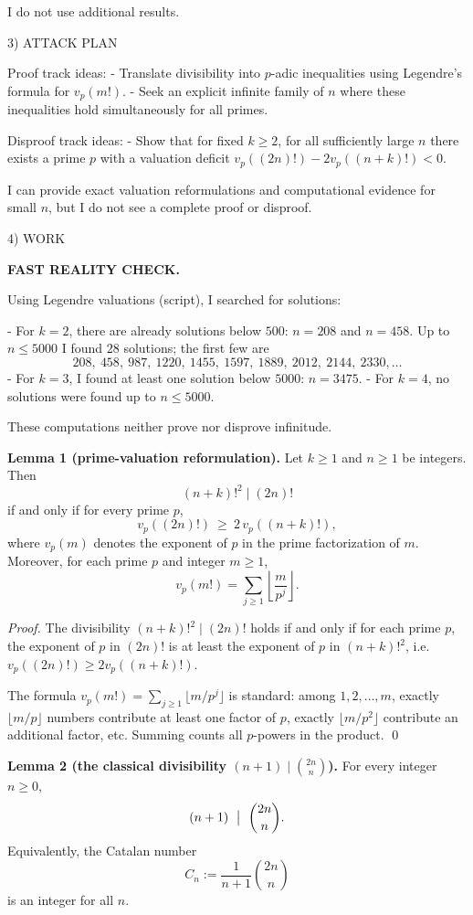 I do not use additional results.

3) ATTACK PLAN

Proof track ideas:
- Translate divisibility into $p$-adic inequalities using Legendre's formula for $v_p(m!)$.
- Seek an explicit infinite family of $n$ where these inequalities hold simultaneously for all primes.

Disproof track ideas:
- Show that for fixed $k\ge 2$, for all sufficiently large $n$ there exists a prime $p$ with a valuation deficit $v_p((2n)!)-2v_p((n+k)!)<0$.

I can provide exact valuation reformulations and computational evidence for small $n$, but I do not see a complete proof or disproof.

4) WORK

\textbf{FAST REALITY CHECK.}

Using Legendre valuations (script), I searched for solutions:

- For $k=2$, there are already solutions below $500$: $n=208$ and $n=458$.
  Up to $n\le 5000$ I found $28$ solutions; the first few are
  \[
  208,\ 458,\ 987,\ 1220,\ 1455,\ 1597,\ 1889,\ 2012,\ 2144,\ 2330,\dots
  \]
- For $k=3$, I found at least one solution below $5000$: $n=3475$.
- For $k=4$, no solutions were found up to $n\le 5000$.

These computations neither prove nor disprove infinitude.

\medskip

\textbf{Lemma 1 (prime-valuation reformulation).}
Let $k\ge 1$ and $n\ge 1$ be integers. Then
\[
(n+k)!^2 \mid (2n)!
\]
if and only if for every prime $p$,
\[
 v_p((2n)!) \ \ge\ 2\,v_p((n+k)!),
\]
where $v_p(m)$ denotes the exponent of $p$ in the prime factorization of $m$.
Moreover, for each prime $p$ and integer $m\ge 1$,
\[
 v_p(m!) = \sum_{j\ge 1} \left\lfloor \frac{m}{p^j}\right\rfloor.
\]

\emph{Proof.}
The divisibility $(n+k)!^2\mid (2n)!$ holds if and only if for each prime $p$, the exponent of $p$ in $(2n)!$ is at least the exponent of $p$ in $(n+k)!^2$, i.e.
$v_p((2n)!)\ge 2v_p((n+k)!)$.

The formula $v_p(m!)=\sum_{j\ge 1}\lfloor m/p^j\rfloor$ is standard: among $1,2,\dots,m$, exactly $\lfloor m/p\rfloor$ numbers contribute at least one factor of $p$, exactly $\lfloor m/p^2\rfloor$ contribute an additional factor, etc. Summing counts all $p$-powers in the product.
\qed

\medskip

\textbf{Lemma 2 (the classical divisibility $(n+1)\mid \binom{2n}{n}$).}
For every integer $n\ge 0$,
\[
(n+1)\ \bigm|\ \binom{2n}{n}.
\]
Equivalently, the Catalan number
\[
C_n:=\frac{1}{n+1}\binom{2n}{n}
\]
is an integer for all $n$.

